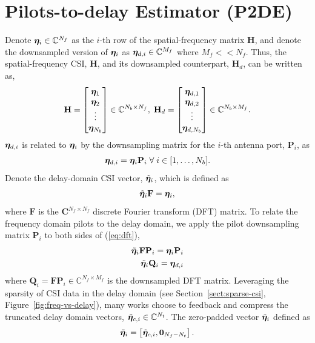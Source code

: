 \section{Pilots-to-delay Estimator (P2DE)}
\label{sect:p2de}

Denote $\boldsymbol{\eta}_i \in \mathbb{C}^{N_f}$ as the $i$-th row of the spatial-frequency matrix $\mathbf{H}$, and denote the downsampled version of $\boldsymbol{\eta}_i$ as $\boldsymbol{\eta}_{d,i} \in \mathbb{C}^{M_f}$ where $M_f << N_f$. Thus, the spatial-frequency CSI, $\mathbf{H}$, and its downsampled counterpart, $\mathbf{H}_d$, can be written as,
\begin{equation}
	\mathbf{H} = \begin{bmatrix} \boldsymbol{\eta}_1 \\ \boldsymbol{\eta}_2 \\ \vdots \\ \boldsymbol{\eta}_{N_b} \\\end{bmatrix}\in\mathbb{C}^{N_b \times N_f}, \; \mathbf{H}_d = \begin{bmatrix} \boldsymbol{\eta}_{d,1} \\ \boldsymbol{\eta}_{d,2} \\ \vdots \\ \boldsymbol{\eta}_{d,N_b} \\\end{bmatrix}\in\mathbb{C}^{N_b \times M_f}.
\end{equation}
$\boldsymbol{\eta}_{d,i}$ is related to $\boldsymbol{\eta}_i$ by the downsampling matrix for the $i$-th antenna port, $\mathbf{P}_i$, as
\begin{equation}
	\boldsymbol{\eta}_{d,i} = \boldsymbol{\eta}_i \mathbf{P}_i \; \forall \; i \in [1, \dots, N_b].
\end{equation}
Denote the delay-domain CSI vector, $\tilde{\boldsymbol{\eta}}_i$, which is defined as
\begin{equation}
	\tilde{\boldsymbol{\eta}}_{i}\mathbf{F} = \boldsymbol{\eta}_i, \label{eq:dft}
\end{equation}
where $\mathbf{F}$ is the $\mathbf{C}^{N_f \times N_f}$ discrete Fourier transform (DFT) matrix. To relate the frequency domain pilots to the delay domain, we apply the pilot downsampling matrix $\mathbf{P}_i$ to both sides of (\ref{eq:dft}),
\begin{align}
	\tilde{\boldsymbol{\eta}}_{i}\mathbf{F}\mathbf{P}_i = \boldsymbol{\eta}_i\mathbf{P}_i \nonumber \\
	\tilde{\boldsymbol{\eta}}_{i}\mathbf{Q}_i = \boldsymbol{\eta}_{d,i} \label{eq:qmat}
\end{align}
where $\mathbf{Q}_i=\mathbf{F}\mathbf{P}_i\in\mathbb{C}^{N_f\times M_f}$ is the downsampled DFT matrix.
Leveraging the sparsity of CSI data in the delay domain (see Section~\ref{sect:sparse-csi}, Figure~\ref{fig:freq-vs-delay}), many works choose to feedback and compress the truncated delay domain vectors, $\tilde{\boldsymbol{\eta}}_{c,i}\in\mathbb{C}^{N_t}$. The zero-padded vector $\tilde{\boldsymbol{\eta}}_{i}$ defined as
\begin{align} 
	\tilde{\boldsymbol{\eta}}_{i} = \left[\tilde{\boldsymbol{\eta}}_{c,i}, \mathbf{0}_{N_f - N_t}\right]. \label{eq:p2d_short}
\end{align}

